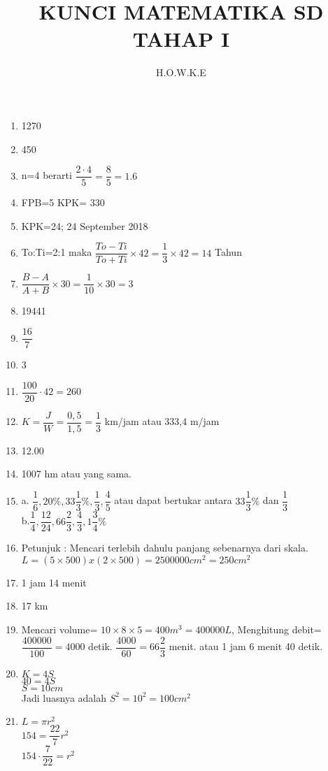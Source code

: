 \documentclass[12pt,a4paper]{article}
\author{H.O.W.K.E}
\title{KUNCI MATEMATIKA SD TAHAP I}
\begin{document}
	\maketitle
	\begin{enumerate}
		\item 1270
		\item 450
		\item n=4 berarti $\dfrac{2\cdot 4}{5}=\dfrac{8}{5}=1.6$
		\item FPB=5 KPK= 330
		\item KPK=24; 24 September 2018
		\item To:Ti=2:1 maka $\dfrac{To-Ti}{To+Ti}\times 42= \dfrac{1}{3} \times 42 = 14$ Tahun
		\item $\dfrac{B-A}{A+B}\times 30= \dfrac{1}{10}\times 30=3$
		\item 19441
		\item $\dfrac{16}{7}$
		\item 3
		\item $\dfrac{100}{20}\cdot 42=260$
		\item $K=\dfrac{J}{W}=\dfrac{0,5}{1,5}=\dfrac{1}{3}$ km/jam atau 333,4 m/jam
		\item 12.00
		\item 1007 hm atau yang sama.
		\item a. $\dfrac{1}{6},20\%,33\dfrac{1}{3}\%,\dfrac{1}{3},\dfrac{4}{5}$ atau dapat bertukar antara $33\dfrac{1}{3}\%$ dan $\dfrac{1}{3}$\\ b.$\dfrac{1}{4},\dfrac{12}{24},66\dfrac{2}{3},\dfrac{4}{3},1\dfrac{3}{4}\%$  
		\item Petunjuk : Mencari terlebih dahulu panjang sebenarnya dari skala. $L=(5\times500)x(2\times500)=2500000 cm^2=250 cm^2$
		\item 1 jam 14 menit
		\item 17 km
		\item Mencari volume= $10\times 8 \times 5=400m^3=400000L$, Menghitung debit= $\dfrac{400000}{100}=4000$ detik. $\dfrac{4000}{60}=66\dfrac{2}{3}$ menit. atau 1 jam 6 menit 40 detik.
		\item $K=4S$\\
			  $40=4S$\\
			  $S=10cm$\\
			  Jadi luasnya adalah $S^2=10^2=100cm^2$
		\item $L=\pi r^2$\\
			  $154=\dfrac{22}{7}r^2$\\
			  $154\cdot\dfrac{7}{22}=r^2$\\

\end{enumerate}
\end{document}
